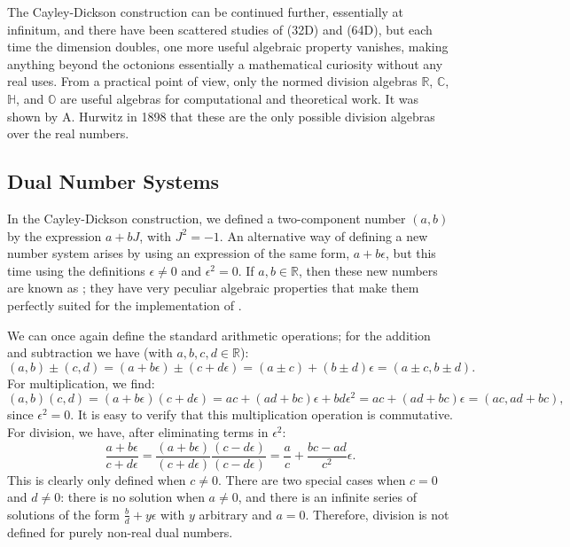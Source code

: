The Cayley-Dickson construction can  be continued further, essentially at infinitum, and there have been scattered studies of  (32D) and  (64D), but each time the dimension doubles, one more useful algebraic property vanishes, making anything beyond the octonions essentially a mathematical curiosity without any real uses.  From a practical point of view, only the normed division algebras $\mathbb{R}$, $\mathbb{C}$, $\mathbb{H}$, and $\mathbb{O}$ are useful algebras for computational and theoretical work. It was shown by A. Hurwitz in 1898 \cite{hurwitz1898a} that these are the only possible division algebras over the real numbers.



\subsection{Dual Number Systems}
In the Cayley-Dickson construction, we defined a two-component number $(a,b)$ by the expression $a+bJ$, with $J^2=-1$.  An alternative way of defining a new number system arises by using an expression of the same form, $a+b\epsilon$, but this time using the definitions $\epsilon\ne 0$ and $\epsilon^2=0$.  If $a,b\in\mathbb{R}$, then these new numbers are known as ; they have very peculiar algebraic properties that make them perfectly suited for the implementation of .

We can once again define the standard arithmetic operations; for the addition and subtraction we have (with $a,b,c,d\in\mathbb{R}$):
\begin{equation}
	(a,b)\pm(c,d) = (a+b\epsilon) \pm (c+d\epsilon) = (a\pm c)+(b \pm d)\epsilon = (a\pm c,b\pm d). 
\end{equation}
For multiplication, we find:
\begin{equation}
	(a,b)(c,d) = (a+b\epsilon)(c+d\epsilon) = ac+(ad+bc)\epsilon + bd\epsilon^2 = ac+(ad+bc)\epsilon = (ac,ad+bc),
\end{equation}
since $\epsilon^2=0$.  It is easy to verify that this multiplication operation is commutative.  For division, we have, after eliminating terms in $\epsilon^2$:
\begin{equation}
	\frac{a+b\epsilon}{c+d\epsilon} = \frac{(a+b\epsilon)}{(c+d\epsilon)}\frac{(c-d\epsilon)}{(c-d\epsilon)}= \frac{a}{c} + \frac{bc-ad}{c^2}\epsilon.
\end{equation}
This is clearly only defined when $c\ne 0$.  There are two special cases when $c=0$ and $d\ne 0$: there is no solution when $a\ne 0$, and there is an infinite series of solutions of the form $\frac{b}{d}+y\epsilon$ with $y$ arbitrary and $a=0$. Therefore, division is not defined for purely non-real dual numbers.  


